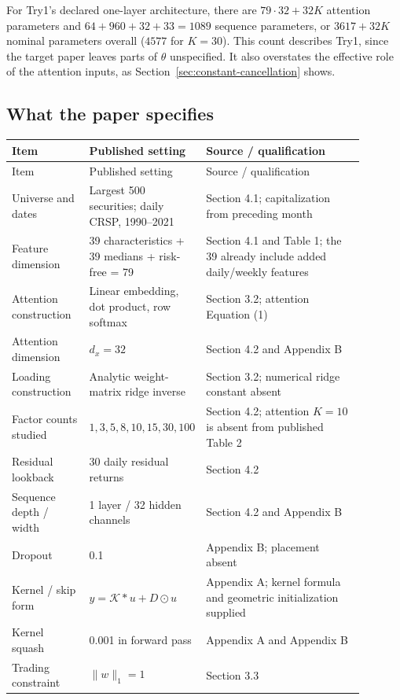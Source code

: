 \documentclass[11pt]{article}
\begin{document}
For Try1's declared one-layer architecture, there are $79\cdot32+32K$
attention parameters and $64+960+32+33=1089$ sequence parameters, or
$3617+32K$ nominal parameters overall ($4577$ for $K=30$). This count
describes Try1, since the target paper leaves parts of $\theta$
unspecified. It also overstates the effective role of the attention
inputs, as Section~\ref{sec:constant-cancellation} shows.

\subsection{What the paper specifies}

\small
\begin{longtable}{p{0.22\linewidth}p{0.22\linewidth}p{0.45\linewidth}}
\toprule
Item & Published setting & Source / qualification\\
\midrule
\endfirsthead
\toprule Item & Published setting & Source / qualification\\\midrule
\endhead
Universe and dates & Largest 500 securities; daily CRSP, 1990--2021
& Section 4.1; capitalization from preceding month\\
Feature dimension & 39 characteristics + 39 medians + risk-free = 79
& Section 4.1 and Table 1; the 39 already include added daily/weekly features\\
Attention construction & Linear embedding, dot product, row softmax
& Section 3.2; attention Equation (1)\\
Attention dimension & $d_x=32$ & Section 4.2 and Appendix B\\
Loading construction & Analytic weight-matrix ridge inverse
& Section 3.2; numerical ridge constant absent\\
Factor counts studied & $1,3,5,8,10,15,30,100$
& Section 4.2; attention $K=10$ is absent from published Table 2\\
Residual lookback & 30 daily residual returns & Section 4.2\\
Sequence depth / width & 1 layer / 32 hidden channels
& Section 4.2 and Appendix B\\
Dropout & 0.1 & Appendix B; placement absent\\
Kernel / skip form & $y=\mathcal K*u+D\odot u$
& Appendix A; kernel formula and geometric initialization supplied\\
Kernel squash & 0.001 in forward pass & Appendix A and Appendix B\\
Trading constraint & $\|w\|_1=1$ & Section 3.3\\

\end{longtable}
\end{document}
